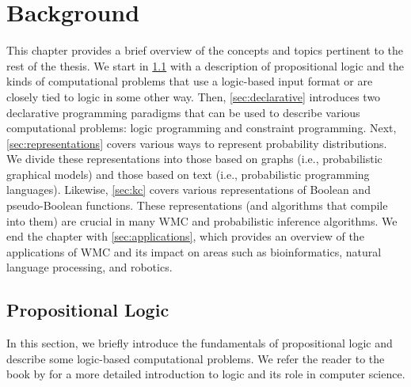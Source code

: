 \chapter{Background}\label{chapter:background}


This chapter provides a brief overview of the concepts and topics pertinent to
the rest of the thesis. We start in \cref{sec:proplogic} with a description of
propositional logic and the kinds of computational problems that use a
logic-based input format or are closely tied to logic in some other way. Then,
\cref{sec:declarative} introduces two declarative programming paradigms that can
be used to describe various computational problems: logic programming and
constraint programming. Next, \cref{sec:representations} covers various ways to
represent probability distributions. We divide these representations into those
based on graphs (i.e., probabilistic graphical models) and those based on text
(i.e., probabilistic programming languages). Likewise, \cref{sec:kc} covers
various representations of Boolean and pseudo-Boolean functions. These
representations (and algorithms that compile into them) are crucial in many WMC
and probabilistic inference algorithms. We end the chapter with
\cref{sec:applications}, which provides an overview of the applications of WMC
and its impact on areas such as bioinformatics, natural language processing, and
robotics.

\section{Propositional Logic}\label{sec:proplogic}

In this section, we briefly introduce the fundamentals of propositional logic
and describe some logic-based computational problems. We refer the reader to the
book by \citet{DBLP:books/daglib/0029942} for a more detailed introduction to
logic and its role in computer science.


